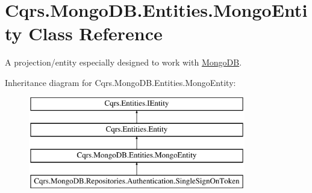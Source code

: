 \hypertarget{classCqrs_1_1MongoDB_1_1Entities_1_1MongoEntity}{}\section{Cqrs.\+Mongo\+D\+B.\+Entities.\+Mongo\+Entity Class Reference}
\label{classCqrs_1_1MongoDB_1_1Entities_1_1MongoEntity}


A projection/entity especially designed to work with \hyperlink{namespaceCqrs_1_1MongoDB}{Mongo\+DB}.  


Inheritance diagram for Cqrs.\+Mongo\+D\+B.\+Entities.\+Mongo\+Entity\+:\begin{figure}[H]
\begin{center}
\leavevmode
\includegraphics[height=4.000000cm]{classCqrs_1_1MongoDB_1_1Entities_1_1MongoEntity}
\end{center}
\end{figure}
